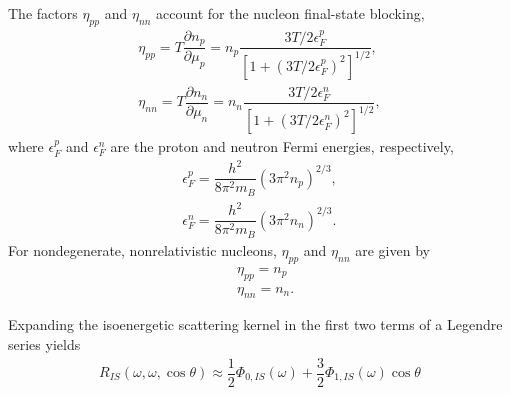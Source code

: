 \documentclass[10pt,preprint]{aastex}
\begin{document}
The factors $\eta_{pp}$ and $\eta_{nn}$ account for the nucleon final-state blocking,
\begin{align}
\eta_{pp} = T \dfrac{\partial n_p}{\partial \mu_p} = n_p \dfrac{3T/2\epsilon^p_F}{[1+(3T/2\epsilon^p_F)^2]^{1/2}}, \\
\eta_{nn} = T \dfrac{\partial n_n}{\partial \mu_n}=n_n \dfrac{3T/2\epsilon^n_F}{[1+(3T/2\epsilon^n_F)^2]^{1/2}},
\end{align}
where $\epsilon^p_F$ and $\epsilon^n_F$ are the proton and neutron Fermi energies, respectively,
\begin{align}
\epsilon^p_F = \dfrac{h^2}{8 \pi^2 m_B}(3\pi^2n_p)^{2/3},\\
\epsilon^n_F = \dfrac{h^2}{8\pi^2m_B}(3\pi^2n_n)^{2/3}.
\end{align}
For nondegenerate, nonrelativistic nucleons, $\eta_{pp}$ and $\eta_{nn}$ are given by
\begin{align}
&\eta_{pp} = n_p \\
&\eta_{nn} = n_n.
\end{align}

Expanding the isoenergetic scattering kernel in the first two terms of a Legendre series yields
\begin{align}
R_{IS}(\omega, \omega, \cos\theta) \approx \dfrac{1}{2} \Phi_{0,IS}(\omega) + \dfrac{3}{2}\Phi_{1,IS}(\omega)\cos\theta
\end{align}
\end{document}

